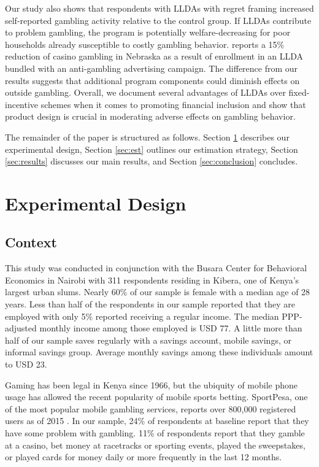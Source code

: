 \documentclass[11pt]{article}
\begin{document}
	Our study also shows that respondents with LLDAs with regret framing increased self-reported gambling activity relative to the control group. If LLDAs contribute to problem gambling, the program is potentially welfare-decreasing for poor households already susceptible to costly gambling behavior.  reports a 15\% reduction of casino gambling in Nebraska as a result of enrollment in an LLDA bundled with an anti-gambling advertising campaign. The difference from our results suggests that additional program components could diminish effects on outside gambling. Overall, we document several advantages of LLDAs over fixed-incentive schemes when it comes to promoting financial inclusion and show that product design is crucial in moderating adverse effects on gambling behavior.

	The remainder of the paper is structured as follows. Section \ref{sec:design} describes our experimental design, Section \ref{sec:est} outlines our estimation strategy, Section \ref{sec:results} discusses our main results, and Section \ref{sec:conclusion} concludes.

\section{Experimental Design} \label{sec:design}

	\subsection{Context}

		This study was conducted in conjunction with the Busara Center for Behavioral Economics in Nairobi with 311 respondents residing in Kibera, one of Kenya's largest urban slums. Nearly 60\% of our sample is female with a median age of 28 years. Less than half of the respondents in our sample reported that they are employed with only 5\% reported receiving a regular income. The median PPP-adjusted monthly income among those employed is USD 77. A little more than half of our sample saves regularly with a savings account, mobile savings, or informal savings group. Average monthly savings among these individuals amount to USD 23.

		Gaming has been legal in Kenya since 1966, but the ubiquity of mobile phone usage has allowed the recent popularity of mobile sports betting. SportPesa, one of the most popular mobile gambling services, reports over 800,000 registered users as of 2015 . In our sample, 24\% of respondents at baseline report that they have some problem with gambling. 11\% of respondents report that they gamble at a casino, bet money at racetracks or sporting events, played the sweepstakes, or played cards for money daily or more frequently in the last 12 months.
\end{document}
